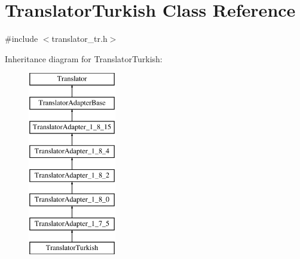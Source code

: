 \hypertarget{class_translator_turkish}{}\section{Translator\+Turkish Class Reference}
\label{class_translator_turkish}


{\ttfamily \#include $<$translator\+\_\+tr.\+h$>$}

Inheritance diagram for Translator\+Turkish\+:\begin{figure}[H]
\begin{center}
\leavevmode
\includegraphics[height=8.000000cm]{class_translator_turkish}
\end{center}
\end{figure}
